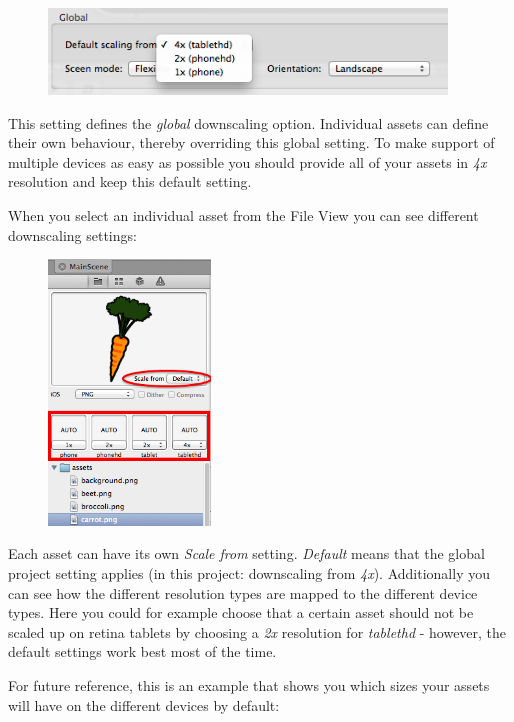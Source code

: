 \begin{figure}[H]
		\centering
		\includegraphics[width=300pt]{images/Chapter2/DownScalingGlobal.png}
\end{figure}

This setting defines the \textit{global} downscaling option. Individual assets
can define their own behaviour, thereby overriding this global setting. To make
support of multiple devices as easy as possible you should provide all of your
assets in \textit{4x} resolution and keep this default setting.

When you select an individual asset from the File View you can see different
downscaling settings:

\begin{figure}[H]
		\centering
		\includegraphics[height=200pt]{images/Chapter2/DownScalingPerAsset.png}
\end{figure}

Each asset can have its own \textit{Scale from} setting. \textit{Default} means
that the global project setting applies (in this project: downscaling from
\textit{4x}). Additionally you can see how the different resolution types are
mapped to the different device types. Here you could for example choose that a
certain asset should not be scaled up on retina tablets by choosing a
\textit{2x} resolution for \textit{tablethd} - however, the default settings
work best most of the time.

For future reference, this is an example that shows you which sizes your assets
will have on the different devices by default:

